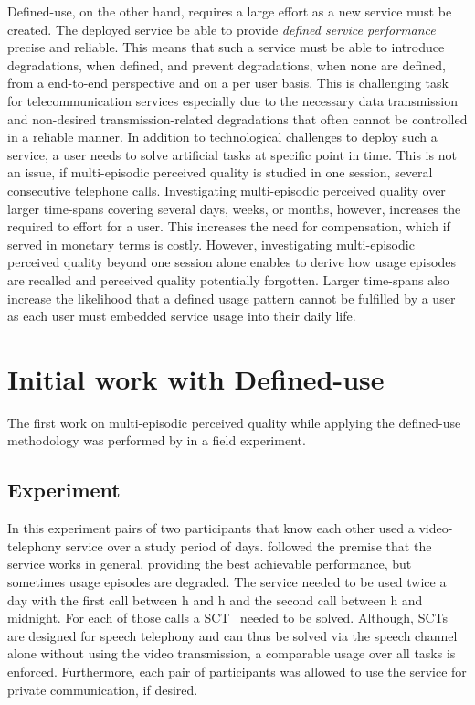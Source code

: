 Defined-use, on the other hand, requires a large effort as a new service must be created.
The deployed service be able to provide \emph{defined service performance} precise and reliable.
This means that such a service must be able to introduce degradations, when defined, and prevent degradations, when none are defined, from a end-to-end perspective and on a per user basis.
This is challenging task for telecommunication services especially due to the necessary data transmission and non-desired transmission-related degradations that often cannot be controlled in a reliable manner.
In addition to technological challenges to deploy such a service, a user needs to solve artificial tasks at specific point in time.
This is not an issue, if multi-episodic perceived quality is studied in one session, \eg several consecutive telephone calls.
Investigating multi-episodic perceived quality over larger time-spans covering several days, weeks, or months, however, increases the required to effort for a user.
This increases the need for compensation, which if served in monetary terms is costly.
However, investigating multi-episodic perceived quality beyond one session alone enables to derive how usage episodes are recalled and perceived quality potentially forgotten.
Larger time-spans also increase the likelihood that a defined usage pattern cannot be fulfilled by a user as each user must embedded service usage into their daily life.

\section{Initial work with Defined-use}
The first work on multi-episodic perceived quality while applying the defined-use methodology was performed by \cite{moller_single-call_2011} in a field experiment.

\subsection{Experiment \citep{moller_single-call_2011}}
In this experiment pairs of two participants that know each other used a video-telephony service over a study period of \unit[12]{days}.
\cite{moller_single-call_2011} followed the premise that the service works in general, \ie providing the best achievable performance, but sometimes usage episodes are degraded.
The service needed to be used twice a day with the first call between \unit[6]{h} and \unit[15]{h} and the second call between \unit[15]{h} and midnight.
For each of those \unit[24]{calls} a \acf{SCT}~\citep{itu-t_p.805:_2007} needed to be solved. %
Although, \acp{SCT} are designed for speech telephony and can thus be solved via the speech channel alone without using the video transmission, a comparable usage over all tasks is enforced.
Furthermore, each pair of participants was allowed to use the service for private communication, if desired.

